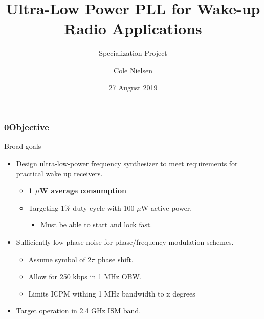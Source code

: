 \documentclass[t, screen, aspectratio=43]{beamer}
\title[Short title]{Ultra-Low Power PLL for Wake-up Radio Applications}
\subtitle{Specialization Project}
\author[C Nielsen]{Cole Nielsen}
\institute[NTNU]{Department of Electronic Systems, NTNU}
\date{27 August 2019}
\begin{document}
\begin{frame}
  \titlepage
\end{frame}



\begin{frame}
  \frametitle{0Objective}
  \begin{block}{Broad goals}
    \begin{itemize}
      \footnotesize
      \item Design ultra-low-power frequency synthesizer to meet requirements for practical wake up receivers.
      \begin{itemize}
        \footnotesize
        \item \textbf{1 $\mu$W average consumption}
        \item Targeting 1\% duty cycle with 100 $\mu$W active power.
        \begin{itemize}
          \item Must be able to start and lock fast.
        \end{itemize}
      \end{itemize} 
      \item Sufficiently low phase noise for phase/frequency modulation schemes.
       \begin{itemize}
        \footnotesize
        \item Assume symbol of 2$\pi$ phase shift. 
        \item Allow for 250 kbps in 1 MHz OBW.\@
        \item Limits ICPM withing 1 MHz bandwidth to x degrees
      \end{itemize}      
      \item Target operation in 2.4 GHz ISM band.
    \end{itemize}
  \end{block}
\end{frame}

\end{document}
